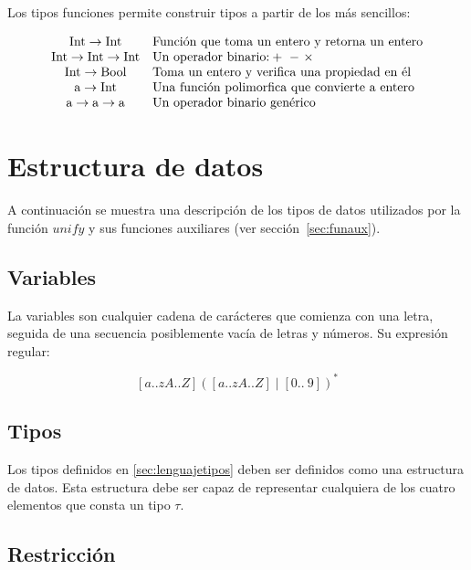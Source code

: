\documentclass{article}
\begin{document}
Los tipos funciones permite construir tipos a partir de los más
sencillos:

\[
  \begin{array}[h]{cl}
    \text{Int} \to \text{Int} & \text{Función que toma un entero y retorna un entero} \\
    \text{Int} \to \text{Int} \to \text{Int} & \text{Un operador binario:} +\ -\ \times\ \\
    \text{Int} \to \text{Bool} & \text{Toma un entero y verifica una propiedad en él} \\
    \text{a} \to \text{Int} & \text{Una función polimorfica que convierte a entero} \\
    \text{a} \to \text{a} \to \text{a} & \text{Un operador binario genérico} \\
  \end{array}
\]

\section{Estructura de datos}\label{sec:estructdatos}

A continuación se muestra una descripción de los tipos de datos
utilizados por la función $unify$ y sus funciones auxiliares (ver
sección~\ref{sec:funaux}).

\subsection{Variables}
\label{sec:var}

La variables son cualquier cadena de carácteres que comienza con una letra,
seguida de una secuencia posiblemente vacía de letras y números. Su expresión
regular:

\[
  [a..zA..Z]([a..zA..Z] \mid [0 ..\ 9])^*
\]

\subsection{Tipos}
\label{sec:estrutipos}

Los tipos definidos en \ref{sec:lenguajetipos} deben ser definidos
como una estructura de datos. Esta estructura debe ser capaz de
representar cualquiera de los cuatro elementos que consta un tipo $\tau$.

\subsection{Restricción}
\label{sec:estrurest}
\end{document}
